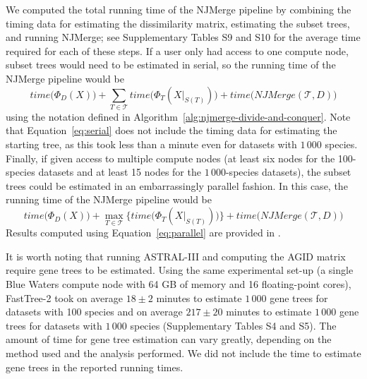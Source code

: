 We computed the total running time of the NJMerge pipeline by combining the timing data for estimating the dissimilarity matrix, estimating the subset trees, and running NJMerge; see Supplementary Tables S9 and S10 for the average time required for each of these steps.
If a user only had access to one compute node, subset trees would need to be estimated in serial, so the running time of the NJMerge pipeline would be
 \begin{equation}\label{eq:serial}
time\big(\Phi_D(X)\big) + \sum_{T \in \mathcal{T}} time\big(\Phi_T(X|_{S(T)})\big) + time\big(NJMerge(\mathcal{T}, D)\big)
\end{equation}
using the notation defined in Algorithm~\ref{alg:njmerge-divide-and-conquer}.
Note that Equation~\ref{eq:serial} does not include the timing data for estimating the starting tree, as this took less than a minute even for datasets with $1\,000$ species.
Finally, if given access to multiple compute nodes (at least six nodes for the 100-species datasets and at least 15 nodes for the $1\,000$-species datasets), the subset trees could be estimated in an embarrassingly parallel fashion.
In this case, the running time of the NJMerge pipeline would be
 \begin{equation}
 \label{eq:parallel}
time\big(\Phi_D(X)\big) + \max_{T \in \mathcal{T}} \{ time\big(\Phi_T(X|_{S(T)})\big) \} + time\big(NJMerge(\mathcal{T}, D)\big)
\end{equation}
Results computed using Equation~\ref{eq:parallel} are provided in \cite{molloy2018njmerge}.

It is worth noting that running ASTRAL-III and computing the AGID matrix require gene trees to be estimated.
Using the same experimental set-up (a single Blue Waters compute node with 64 GB of memory and 16 floating-point cores), FastTree-2 took on average $18 \pm 2$ minutes to estimate $1\,000$ gene trees for datasets with 100 species and on average $217 \pm 20$ minutes to estimate $1\,000$ gene trees for datasets with $1\,000$ species (Supplementary Tables S4 and S5).
The amount of time for gene tree estimation can vary greatly, depending on the method used and the analysis performed.
We did not include the time to estimate gene trees in the reported running times.

